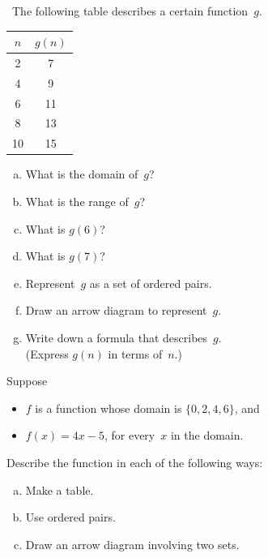 \begin{exercise}{23} \ 
 The following table describes a certain function~$g$.
\begin{center}
\begin{tabular}{|c|c|}
\hline
$n$ & $g(n)$ \\
\hline
2 & 7 \\
 4 & 9 \\
 6  & 11 \\
 8 & 13 \\
 10 & 15 \\
\hline
\end{tabular}
\end{center}
\begin{enumerate}[(a)]
\item   \label{FunctionsChapExers-gTable-domain}
What is the domain of~$g$?
\item   \label{FunctionsChapExers-gTable-range}
What is the range of~$g$?
\item  \label{FunctionsChapExers-gTable-g(6)}
What is $g(6)$?
\item  \label{FunctionsChapExers-gTable-g(7)}
What is $g(7)$?
\item  \label{FunctionsChapExers-gTable-pairs}
Represent~$g$ as a set of ordered pairs.
\item  \label{FunctionsChapExers-gTable-arrow}
Draw an arrow diagram to represent~$g$.
\item  \label{FunctionsChapExers-gTable-formula}
Write down a formula that describes~$g$. 
\\(Express
$g(n)$ in terms of~$n$.)
\end{enumerate}
\end{exercise}

\begin{exercise}{}
 Suppose 
\begin{itemize}
\item $f$ is a function whose domain is $\{0,2,4,6\}$, 
and 
\item $f(x) = 4x - 5$, for every~$x$ in the domain. 
\end{itemize}
Describe the function in each of the following ways:
 \begin{enumerate}[(a)]
\item  \label{FunctionsChapExers-fFormula-table}
Make a table.
\item  \label{FunctionsChapExers-fFormula-pairs}
Use ordered pairs.
\item  \label{FunctionsChapExers-fFormula-arrow}
Draw an arrow diagram involving two sets.
\end{enumerate}
\end{exercise}

